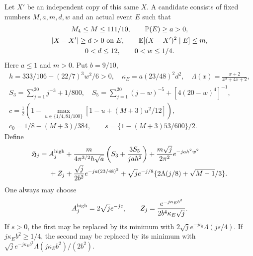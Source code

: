 Let $X'$ be an independent copy of this same $X$. A candidate consists
of fixed numbers $M,a,m,d,w$ and an actual event $E$ such that
\begin{equation}\label{ut:event-input}
\begin{gathered}
 M_4\le M\le111/10,\qquad\mathbb P(E)\ge a>0,\\
 |X-X'|\ge d>0\text{ on }E,\qquad
 \mathbb E[(X-X')^2\mid E]\le m,\\
 0<d\le12,\qquad0<w\le1/4.
\end{gathered}
\end{equation}
Here $a\le1$ and $m>0$. Put $b=9/10$,
\begin{gather*}
 h=333/106-(22/7)^3w^2/6>0,\quad
 \kappa_E=a(23/48)^2d^2,\quad
 \Lambda(x)=\frac{x+2}{x^2+4x+2},\\
 S_3=\sum_{j=1}^{20}j^{-3}+1/800,\quad
 S_5=\sum_{j=1}^{20}(j-w)^{-5}+[4(20-w)^4]^{-1},\\
 c=\tfrac12\left(1-\max_{u\in\{1/4,81/100\}}
                    [1-u+(M+3)u^2/12]\right),\\
 c_0=1/8-(M+3)/384,\qquad s=\{1-(M+3)53/600\}/2.
\end{gather*}
Define
\begin{align}\label{ut:high-six}
 \mathfrak H_j={}&A_j^{\rm high}
 +\frac{m}{4\pi^{3/2}h\sqrt a}
                \left(S_3+\frac{3S_5}{jah^2}\right)
 +\frac{m\sqrt j}{2\pi^2}e^{-jah^2w^2}\notag\\
 &+Z_j+\frac{\sqrt j}{2b^2}e^{-ja(23/48)^2}
 +\sqrt j e^{-j/8}\{2\Lambda(j/8)+\sqrt{M-1}/3\}.
\end{align}
One always may choose
\[
 A_j^{\rm high}=2\sqrt j e^{-jc},\qquad
 Z_j=\frac{e^{-j\kappa_Eb^2}}{2b^4\kappa_E\sqrt j}.
\]
If $s>0$, the first may be replaced by its minimum with
$2\sqrt j e^{-jc_0}\Lambda(js/4)$.
If $j\kappa_Eb^2\ge1/4$, the second may be replaced by its minimum
with $\sqrt j e^{-j\kappa_Eb^2}\Lambda(j\kappa_Eb^2)/(2b^2)$.

